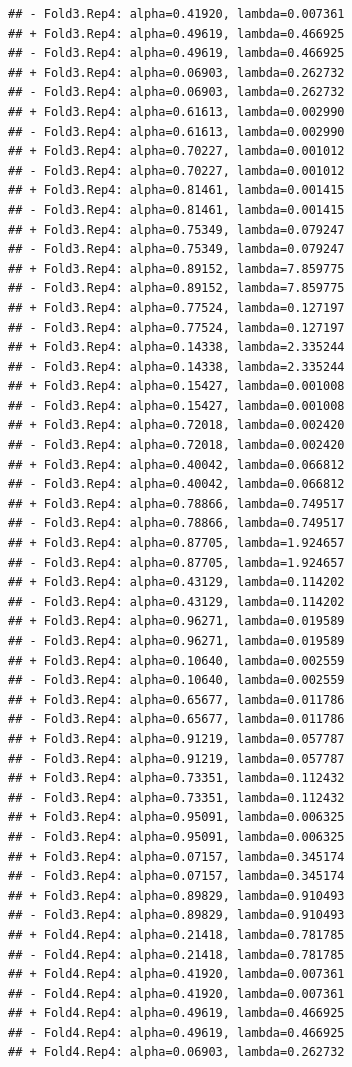 \documentclass[
]{article}
\begin{document}
\begin{verbatim}
## - Fold3.Rep4: alpha=0.41920, lambda=0.007361 
## + Fold3.Rep4: alpha=0.49619, lambda=0.466925 
## - Fold3.Rep4: alpha=0.49619, lambda=0.466925 
## + Fold3.Rep4: alpha=0.06903, lambda=0.262732 
## - Fold3.Rep4: alpha=0.06903, lambda=0.262732 
## + Fold3.Rep4: alpha=0.61613, lambda=0.002990 
## - Fold3.Rep4: alpha=0.61613, lambda=0.002990 
## + Fold3.Rep4: alpha=0.70227, lambda=0.001012 
## - Fold3.Rep4: alpha=0.70227, lambda=0.001012 
## + Fold3.Rep4: alpha=0.81461, lambda=0.001415 
## - Fold3.Rep4: alpha=0.81461, lambda=0.001415 
## + Fold3.Rep4: alpha=0.75349, lambda=0.079247 
## - Fold3.Rep4: alpha=0.75349, lambda=0.079247 
## + Fold3.Rep4: alpha=0.89152, lambda=7.859775 
## - Fold3.Rep4: alpha=0.89152, lambda=7.859775 
## + Fold3.Rep4: alpha=0.77524, lambda=0.127197 
## - Fold3.Rep4: alpha=0.77524, lambda=0.127197 
## + Fold3.Rep4: alpha=0.14338, lambda=2.335244 
## - Fold3.Rep4: alpha=0.14338, lambda=2.335244 
## + Fold3.Rep4: alpha=0.15427, lambda=0.001008 
## - Fold3.Rep4: alpha=0.15427, lambda=0.001008 
## + Fold3.Rep4: alpha=0.72018, lambda=0.002420 
## - Fold3.Rep4: alpha=0.72018, lambda=0.002420 
## + Fold3.Rep4: alpha=0.40042, lambda=0.066812 
## - Fold3.Rep4: alpha=0.40042, lambda=0.066812 
## + Fold3.Rep4: alpha=0.78866, lambda=0.749517 
## - Fold3.Rep4: alpha=0.78866, lambda=0.749517 
## + Fold3.Rep4: alpha=0.87705, lambda=1.924657 
## - Fold3.Rep4: alpha=0.87705, lambda=1.924657 
## + Fold3.Rep4: alpha=0.43129, lambda=0.114202 
## - Fold3.Rep4: alpha=0.43129, lambda=0.114202 
## + Fold3.Rep4: alpha=0.96271, lambda=0.019589 
## - Fold3.Rep4: alpha=0.96271, lambda=0.019589 
## + Fold3.Rep4: alpha=0.10640, lambda=0.002559 
## - Fold3.Rep4: alpha=0.10640, lambda=0.002559 
## + Fold3.Rep4: alpha=0.65677, lambda=0.011786 
## - Fold3.Rep4: alpha=0.65677, lambda=0.011786 
## + Fold3.Rep4: alpha=0.91219, lambda=0.057787 
## - Fold3.Rep4: alpha=0.91219, lambda=0.057787 
## + Fold3.Rep4: alpha=0.73351, lambda=0.112432 
## - Fold3.Rep4: alpha=0.73351, lambda=0.112432 
## + Fold3.Rep4: alpha=0.95091, lambda=0.006325 
## - Fold3.Rep4: alpha=0.95091, lambda=0.006325 
## + Fold3.Rep4: alpha=0.07157, lambda=0.345174 
## - Fold3.Rep4: alpha=0.07157, lambda=0.345174 
## + Fold3.Rep4: alpha=0.89829, lambda=0.910493 
## - Fold3.Rep4: alpha=0.89829, lambda=0.910493 
## + Fold4.Rep4: alpha=0.21418, lambda=0.781785 
## - Fold4.Rep4: alpha=0.21418, lambda=0.781785 
## + Fold4.Rep4: alpha=0.41920, lambda=0.007361 
## - Fold4.Rep4: alpha=0.41920, lambda=0.007361 
## + Fold4.Rep4: alpha=0.49619, lambda=0.466925 
## - Fold4.Rep4: alpha=0.49619, lambda=0.466925 
## + Fold4.Rep4: alpha=0.06903, lambda=0.262732 

\end{verbatim}
\end{document}
